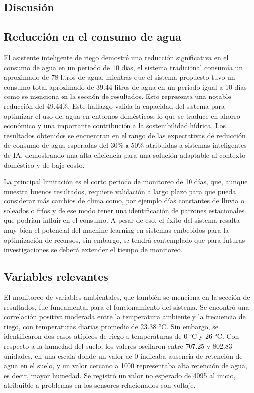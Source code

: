 \documentclass[pdflatex,sn-mathphys-num]{sn-jnl}%
\theoremstyle{thmstyleone}%
\theoremstyle{thmstyletwo}%
\theoremstyle{thmstylethree}%
\begin{document}
\begin{multicols}{2}
\justifying

\section*{Discusión}

\subsection*{Reducción en el consumo de agua}

El asistente inteligente de riego demostró una reducción significativa en el consumo de agua en un periodo de 10 días, el sistema tradicional consumía un aproximado de 78 litros de agua, mientras que el sistema propuesto tuvo un consumo total aproximado de 39.44 litros de agua en un periodo igual a 10 días como se menciona en la sección de resultados. Esto representa una notable reducción del 49.44\%. Este hallazgo valida la capacidad del sistema para optimizar el uso del agua en entornos domésticos, lo que se traduce en ahorro económico y una importante contribución a la sostenibilidad hídrica. Los resultados obtenidos se encuentran en el rango de las expectativas de reducción de consumo de agua esperadas del 30\% a 50\% atribuidas a sistemas inteligentes de IA, demostrando una alta eficiencia para una solución adaptable al contexto doméstico y de bajo costo.

La principal limitación es el corto periodo de monitoreo de 10 días, que, aunque muestra buenos resultados, requiere validación a largo plazo para que pueda considerar más cambios de clima como, por ejemplo días constantes de lluvia o soleados o fríos y de ese modo tener una identificación de patrones estacionales que podrían influir en el consumo. A pesar de eso, el éxito del sistema resalta muy bien el potencial del machine learning en sistemas embebidos para la optimización de recursos, sin embargo, se tendrá contemplado que para futuras investigaciones se deberá extender el tiempo de monitoreo.

\subsection*{Variables relevantes}
El monitoreo de variables ambientales, que también se menciona en la sección de resultados, fue fundamental para el funcionamiento del sistema. Se encontró una correlación positiva moderada entre la temperatura ambiente y la frecuencia de riego, con temperaturas diarias promedio de 23.38 °C. Sin embargo, se identificaron dos casos atípicos de riego a temperaturas de 0 °C y 26 °C. Con respecto a la humedad del suelo, los valores oscilaron entre 707.25 y 802.83 unidades, en una escala donde un valor de 0 indicaba ausencia de retención de agua en el suelo, y un valor cercano a 1000 representaba alta retención de agua, es decir, mayor humedad. Se registró un valor no esperado de 4095 al inicio, atribuible a problemas en los sensores relacionados con voltaje.


\end{multicols}
\end{document}
